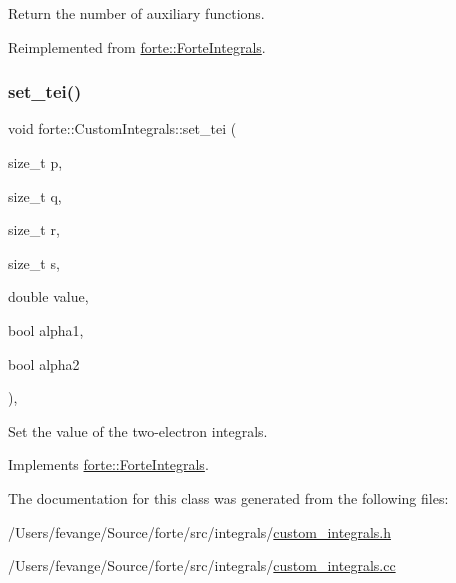 Return the number of auxiliary functions. 



Reimplemented from \mbox{\hyperlink{classforte_1_1_forte_integrals_af04858e7813556747745f90ffbda81a4}{forte\+::\+Forte\+Integrals}}.

\mbox{\label{classforte_1_1_custom_integrals_ab9b7fd99d359eedcde4fcbf5e5df1795}} 
\subsubsection{\texorpdfstring{set\+\_\+tei()}{set\_tei()}}
{\footnotesize\ttfamily void forte\+::\+Custom\+Integrals\+::set\+\_\+tei (\begin{DoxyParamCaption}\item[{size\+\_\+t}]{p,  }\item[{size\+\_\+t}]{q,  }\item[{size\+\_\+t}]{r,  }\item[{size\+\_\+t}]{s,  }\item[{double}]{value,  }\item[{bool}]{alpha1,  }\item[{bool}]{alpha2 }\end{DoxyParamCaption})\hspace{0.3cm}{\ttfamily [override]}, {\ttfamily [virtual]}}



Set the value of the two-\/electron integrals. 



Implements \mbox{\hyperlink{classforte_1_1_forte_integrals_aaccd56e90bbc3c423158efb154336b9c}{forte\+::\+Forte\+Integrals}}.



The documentation for this class was generated from the following files\+:\begin{DoxyCompactItemize}
\item 
/\+Users/fevange/\+Source/forte/src/integrals/\mbox{\hyperlink{custom__integrals_8h}{custom\+\_\+integrals.\+h}}\item 
/\+Users/fevange/\+Source/forte/src/integrals/\mbox{\hyperlink{custom__integrals_8cc}{custom\+\_\+integrals.\+cc}}\end{DoxyCompactItemize}
